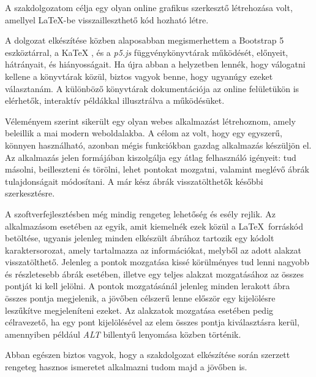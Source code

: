 
A szakdolgozatom célja egy olyan online grafikus szerkesztő létrehozása volt, amellyel \LaTeX-be visszailleszthető kód hozható létre. 

A dolgozat elkészítése közben alaposabban megismerhettem a Bootstrap 5 \cite{bootstrap} eszköztárral, a KaTeX \cite{katex}, és a \textit{p5.js} \cite{p5js} függvénykönyvtárak működését, előnyeit, hátrányait, és hiányosságait. Ha újra abban a helyzetben lennék, hogy válogatni kellene a könyvtárak közül, biztos vagyok benne, hogy ugyanúgy ezeket választanám. A különböző könyvtárak dokumentációja az online felületükön is elérhetők, interaktív példákkal illusztrálva a működésüket.

Véleményem szerint sikerült egy olyan webes alkalmazást létrehoznom, amely beleillik a mai modern weboldalakba. A célom az volt, hogy egy egyszerű, könnyen használható, azonban mégis funkciókban gazdag alkalmazás készüljön el. Az alkalmazás jelen formájában kiszolgálja egy átlag felhasználó igényeit: tud másolni, beilleszteni és törölni, lehet pontokat mozgatni, valamint meglévő ábrák tulajdonságait módosítani. A már kész ábrák visszatölthetők későbbi szerkesztésre.

A szoftverfejlesztésben még mindig rengeteg lehetőség és esély rejlik. Az alkalmazásom esetében az egyik, amit kiemelnék ezek közül a \LaTeX\ forráskód betöltése, ugyanis jelenleg minden elkészült ábrához tartozik egy kódolt karaktersorozat, amely tartalmazza az információkat, melyből az adott alakzat visszatölthető. Jelenleg a pontok mozgatása kissé körülményes tud lenni nagyobb és részletesebb ábrák esetében, illetve egy teljes alakzat mozgatásához az összes pontját ki kell jelölni. A pontok mozgatásánál jelenleg minden lerakott ábra összes pontja megjelenik, a jövőben célszerű lenne először egy kijelölésre leszűkítve megjeleníteni ezeket. Az alakzatok mozgatása esetében pedig célravezető, ha egy pont kijelölésével az elem összes pontja kiválasztásra kerül, amennyiben például \textit{ALT} billentyű lenyomása közben történik.

Abban egészen biztos vagyok, hogy a szakdolgozat elkészítése során szerzett rengeteg hasznos ismeretet alkalmazni tudom majd a jövőben is.